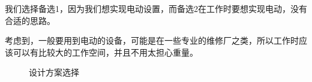 \documentclass[12pt, a4paper, oneside]{ctexart}
\begin{document}
我们选择备选1，因为我们想实现电动设置，而备选2在工作时要想实现电动，没有合适的思路。

考虑到，一般要用到电动的设备，可能是在一些专业的维修厂之类，所以工作时应该可以有比较大的工作空间，并且不用太担心重量。

\begin{figure}[htbp]
  \centering
  \quad
  
  \caption{设计方案选择}


\end{figure}
\end{document}
